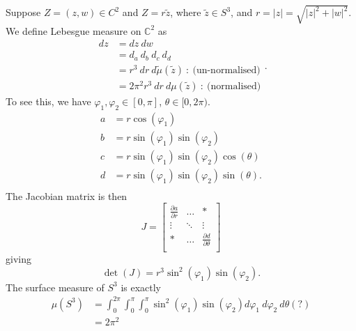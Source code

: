 \documentclass{article}
\begin{document}
Suppose $Z = (z,w) \in C^{2}$ and $Z = r \tilde{z}$, where $\tilde{z} \in S^{3}$, and $r = | z | = \sqrt{| z |^{2} + | w |^{2}}$. We define Lebesgue measure on $\mathbb{C}^{2}$ as 
\begin{equation}
    \begin{split}
        dz &= dz \ dw \\
           &= d_a \ d_b \ d_c \ d_{d} \\
           &= r^{3} \ dr \ d\tilde{\mu}(\tilde{z}) \ : \ \text{(un-normalised)} \\
           &= 2 \pi^{2} r^{3} \ dr \ d\mu (\tilde{z}) \ : \ \text{(normalised)}
    \end{split}.
\end{equation}
To see this, we have $\varphi_1, \varphi_2 \in [0, \pi]$, $\theta \in [0, 2\pi)$. 
\begin{equation}
    \begin{split}
        a &= r \cos\left(\varphi_1\right) \\
        b &= r \sin\left(\varphi_1\right) \sin\left(\varphi_2\right) \\
        c &= r \sin\left(\varphi_1\right) \sin\left(\varphi_2\right) \cos\left(\theta\right) \\
        d &= r \sin\left(\varphi_1\right) \sin\left(\varphi_2\right) \sin\left(\theta\right) .\\
    \end{split}
\end{equation}
The Jacobian matrix is then
\begin{equation}
    J = 
    \begin{bmatrix} 
        \frac{\partial a}{\partial r} & \ldots & * \\
		\vdots & \ddots & \vdots \\
		* & \ldots & \frac{\partial d}{\partial \theta} \\		
    \end{bmatrix}
\end{equation}
giving
\begin{equation}
    \det\left( J \right) = r^{3} \sin^{2}\left(\varphi_1\right) \sin\left(\varphi_2\right).
\end{equation}
The surface measure of $S^{3}$ is exactly
\begin{equation}
    \begin{split}
        \mu(S^{3}) &= \int^{2\pi}_{0} \int^{\pi}_{0} \int^{\pi}_{0}
        \sin^{2}\left(\varphi_1\right) \sin\left(\varphi_2\right)
        d\varphi_1 \ d\varphi_2 \ d\theta
        (?) \\
                   &= 2 \pi^{2}
    \end{split}
\end{equation}
\end{document}
